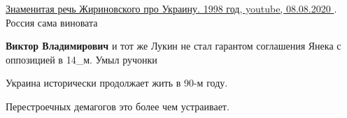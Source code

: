 \begin{itemize}
\href{https://www.youtube.com/watch?v=WnDs3gW6_Xk}{%
Знаменитая речь Жириновского про Украину. 1998 год, youtube, 08.08.2020%
}
. Россия сама виновата

\begin{itemize}
 
\textbf{Виктор Владимирович} и тот же Лукин не стал гарантом соглашения Янека с оппозицией в 14_м. Умыл ручонки
\end{itemize}

 
Украина исторически продолжает жить в 90-м году.

Перестроечных демагогов это более чем устраивает.

\end{itemize}

